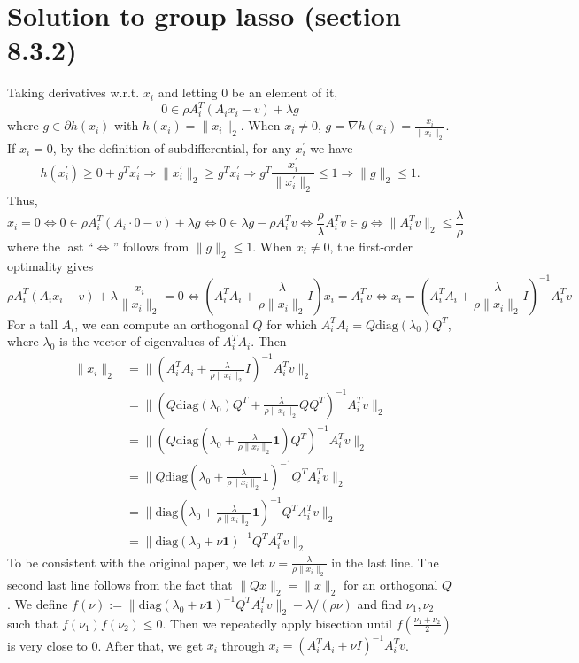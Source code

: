 \documentclass{article}
\theoremstyle{remark}
\begin{document}
\section{Solution to group lasso (section 8.3.2)}
Taking derivatives w.r.t. $x_i$ and letting 0 be an element of it,
\[
0\in\rho A_i^T(A_ix_i-v) + \lambda g
\]
where $g\in \partial h(x_i)$ with $h(x_i)=\|x_i\|_2$. When $x_i\neq0$, $g=\nabla h(x_i)=\frac{x_i}{\|x_i\|_2}$. If $x_i=0$, by the definition of subdifferential, for any $x_i^{\prime}$ we have
\[
h(x_i^{\prime})\ge 0 + g^Tx_i^{\prime}\Rightarrow \|x_i^{\prime}\|_2\ge g^Tx_i^{\prime}\Rightarrow g^T\frac{x_i^{\prime}}{\|x_i^{\prime}\|_2}\le 1\Rightarrow \|g\|_2\le 1.
\]
Thus,
\[
x_i=0\Leftrightarrow 0\in \rho A_i^T(A_i\cdot 0-v) + \lambda g\Leftrightarrow 0\in \lambda g-\rho A_i^Tv  \Leftrightarrow \frac{\rho}{\lambda} A_i^Tv\in g\Leftrightarrow\|A_i^Tv\|_2\le\frac{\lambda}{\rho}
\]
where the last ``$\Leftrightarrow$'' follows from $\|g\|_2\le 1$. When $x_i\neq0$, the first-order optimality gives
\begin{equation*}
\rho A_i^T(A_ix_i-v) + \lambda\frac{x_i}{\|x_i\|_2}=0 \Leftrightarrow ( A_i^TA_i+\frac{\lambda}{\rho\|x_i\|_2}I)x_i= A_i^Tv\Leftrightarrow
x_i=( A_i^TA_i+\frac{\lambda}{\rho\|x_i\|_2}I)^{-1}A_i^Tv
\end{equation*}
For a tall $A_i$, we can compute an orthogonal $Q$ for which $A_i^TA_i=Q\mathrm{diag}(\lambda_0)Q^T$, where $\lambda_0$ is the vector of eigenvalues of $A_i^TA_i$. Then
\begin{align*}
  \|x_i\|_2&=\|( A_i^TA_i+\frac{\lambda}{\rho\|x_i\|_2}I)^{-1}A_i^Tv\|_2 \\
  &=\|(Q\mathrm{diag}(\lambda_0)Q^T+\frac{\lambda}{\rho\|x_i\|_2}QQ^T)^{-1}A_i^Tv\|_2 \\
  &=\|\left(Q\mathrm{diag}(\lambda_0+\frac{\lambda}{\rho\|x_i\|_2}\mathbf{1})Q^T\right)^{-1}A_i^Tv\|_2 \\
  &=\|Q\mathrm{diag}(\lambda_0+\frac{\lambda}{\rho\|x_i\|_2}\mathbf{1})^{-1}Q^TA_i^Tv\|_2\\
  &=\|\mathrm{diag}(\lambda_0+\frac{\lambda}{\rho\|x_i\|_2}\mathbf{1})^{-1}Q^TA_i^Tv\|_2\\
  &=\|\mathrm{diag}(\lambda_0+\nu\mathbf{1})^{-1}Q^TA_i^Tv\|_2
\end{align*}
To be consistent with the original paper, we let $\nu=\frac{\lambda}{\rho\|x_i\|_2}$ in the last line. The second last line follows from the fact that $\|Qx\|_2=\|x\|_2$ for an orthogonal $Q$. We define $f(\nu):=\|\mathrm{diag}(\lambda_0+\nu\mathbf{1})^{-1}Q^TA_i^Tv\|_2-\lambda/(\rho \nu)$ and find $\nu_1,\nu_2$ such that $f(\nu_1)f(\nu_2)\le 0$. Then we repeatedly apply bisection until $f(\frac{\nu_1+\nu_2}{2})$ is very close to 0. After that, we get $x_i$ through $x_i=(A_i^TA_i+\nu I)^{-1}A_i^Tv$. 
\end{document}

